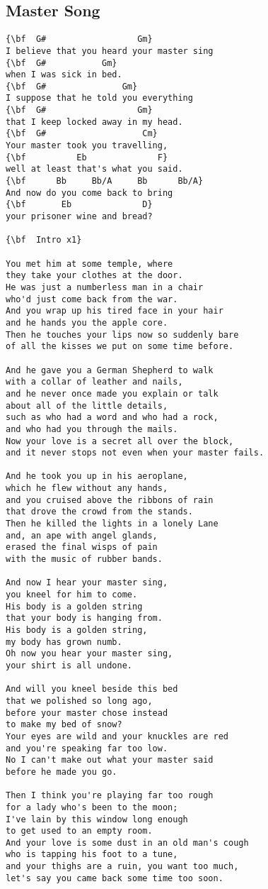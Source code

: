 \documentclass[a4paper]{article}
\begin{document}
\subsection{Master Song}
\begin{Verbatim}[commandchars=\\\{\}]
{\bf  G#			      Gm}
I believe that you heard your master sing 
{\bf  G#		   Gm}
when I was sick in bed. 
{\bf  G#			   Gm}
I suppose that he told you everything 
{\bf  G#			      Gm}
that I keep locked away in my head. 
{\bf  G#                   Cm}
Your master took you travelling, 
{\bf          Eb		      F}
well at least that's what you said. 
{\bf      Bb     Bb/A     Bb      Bb/A}
And now do you come back to bring 
{\bf       Eb		       D}
your prisoner wine and bread? 

{\bf  Intro x1}

You met him at some temple, where 
they take your clothes at the door. 
He was just a numberless man in a chair 
who'd just come back from the war. 
And you wrap up his tired face in your hair 
and he hands you the apple core. 
Then he touches your lips now so suddenly bare 
of all the kisses we put on some time before. 

And he gave you a German Shepherd to walk 
with a collar of leather and nails, 
and he never once made you explain or talk 
about all of the little details, 
such as who had a word and who had a rock, 
and who had you through the mails. 
Now your love is a secret all over the block, 
and it never stops not even when your master fails. 

And he took you up in his aeroplane, 
which he flew without any hands, 
and you cruised above the ribbons of rain 
that drove the crowd from the stands. 
Then he killed the lights in a lonely Lane 
and, an ape with angel glands, 
erased the final wisps of pain 
with the music of rubber bands. 

And now I hear your master sing, 
you kneel for him to come. 
His body is a golden string 
that your body is hanging from. 
His body is a golden string, 
my body has grown numb. 
Oh now you hear your master sing, 
your shirt is all undone. 

And will you kneel beside this bed 
that we polished so long ago, 
before your master chose instead 
to make my bed of snow? 
Your eyes are wild and your knuckles are red 
and you're speaking far too low. 
No I can't make out what your master said 
before he made you go. 

Then I think you're playing far too rough 
for a lady who's been to the moon; 
I've lain by this window long enough 
to get used to an empty room. 
And your love is some dust in an old man's cough 
who is tapping his foot to a tune, 
and your thighs are a ruin, you want too much, 
let's say you came back some time too soon. 


\end{Verbatim}
\end{document}
